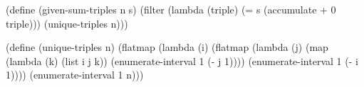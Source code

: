 \begtt\scm
(define (given-sum-triples n s)
  (filter (lambda (triple)
            (= s (accumulate + 0 triple)))
          (unique-triples n)))

(define (unique-triples n)
  (flatmap (lambda (i)
             (flatmap (lambda (j)
                        (map (lambda (k) (list i j k))
                             (enumerate-interval 1 (- j 1))))
                      (enumerate-interval 1 (- i 1))))
           (enumerate-interval 1 n)))
\endtt
